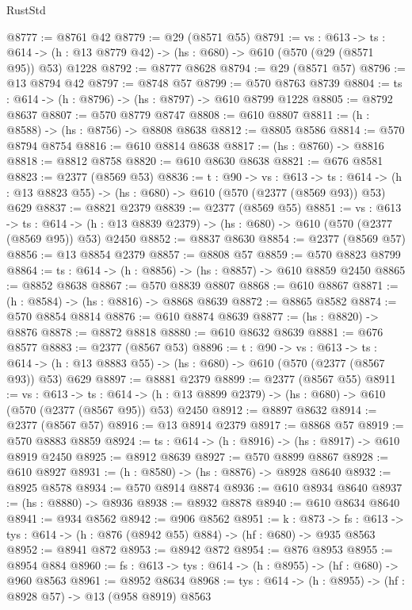 \begin{lexlean}{RustStd}
\begin{coremodule}
@8777 := @8761 @42
@8779 := @29 (@8571 @55)
@8791 := {vs : @613} ->
  {ts : @614} -> (h : @13 @8779 @42) -> (hs : @680) -> @610 (@570 (@29 (@8571 @95)) @53) @1228
@8792 := @8777 @8628
@8794 := @29 (@8571 @57)
@8796 := @13 @8794 @42
@8797 := @8748 @57
@8799 := @570 @8763 @8739
@8804 := {ts : @614} -> (h : @8796) -> (hs : @8797) -> @610 @8799 @1228
@8805 := @8792 @8637
@8807 := @570 @8779 @8747
@8808 := @610 @8807
@8811 := (h : @8588) -> (hs : @8756) -> @8808 @8638
@8812 := @8805 @8586
@8814 := @570 @8794 @8754
@8816 := @610 @8814 @8638
@8817 := (hs : @8760) -> @8816
@8818 := @8812 @8758
@8820 := @610 @8630 @8638
@8821 := @676 @8581
@8823 := @2377 (@8569 @53)
@8836 := {t : @90} ->
  {vs : @613} ->
  {ts : @614} -> (h : @13 @8823 @55) -> (hs : @680) -> @610 (@570 (@2377 (@8569 @93)) @53) @629
@8837 := @8821 @2379
@8839 := @2377 (@8569 @55)
@8851 := {vs : @613} ->
  {ts : @614} -> (h : @13 @8839 @2379) -> (hs : @680) -> @610 (@570 (@2377 (@8569 @95)) @53) @2450
@8852 := @8837 @8630
@8854 := @2377 (@8569 @57)
@8856 := @13 @8854 @2379
@8857 := @8808 @57
@8859 := @570 @8823 @8799
@8864 := {ts : @614} -> (h : @8856) -> (hs : @8857) -> @610 @8859 @2450
@8865 := @8852 @8638
@8867 := @570 @8839 @8807
@8868 := @610 @8867
@8871 := (h : @8584) -> (hs : @8816) -> @8868 @8639
@8872 := @8865 @8582
@8874 := @570 @8854 @8814
@8876 := @610 @8874 @8639
@8877 := (hs : @8820) -> @8876
@8878 := @8872 @8818
@8880 := @610 @8632 @8639
@8881 := @676 @8577
@8883 := @2377 (@8567 @53)
@8896 := {t : @90} ->
  {vs : @613} ->
  {ts : @614} -> (h : @13 @8883 @55) -> (hs : @680) -> @610 (@570 (@2377 (@8567 @93)) @53) @629
@8897 := @8881 @2379
@8899 := @2377 (@8567 @55)
@8911 := {vs : @613} ->
  {ts : @614} -> (h : @13 @8899 @2379) -> (hs : @680) -> @610 (@570 (@2377 (@8567 @95)) @53) @2450
@8912 := @8897 @8632
@8914 := @2377 (@8567 @57)
@8916 := @13 @8914 @2379
@8917 := @8868 @57
@8919 := @570 @8883 @8859
@8924 := {ts : @614} -> (h : @8916) -> (hs : @8917) -> @610 @8919 @2450
@8925 := @8912 @8639
@8927 := @570 @8899 @8867
@8928 := @610 @8927
@8931 := (h : @8580) -> (hs : @8876) -> @8928 @8640
@8932 := @8925 @8578
@8934 := @570 @8914 @8874
@8936 := @610 @8934 @8640
@8937 := (hs : @8880) -> @8936
@8938 := @8932 @8878
@8940 := @610 @8634 @8640
@8941 := @934 @8562
@8942 := @906 @8562
@8951 := {k : @873} ->
  {fs : @613} -> {tys : @614} -> (h : @876 (@8942 @55) @884) -> (hf : @680) -> @935 @8563
@8952 := @8941 @872
@8953 := @8942 @872
@8954 := @876 @8953
@8955 := @8954 @884
@8960 := {fs : @613} -> {tys : @614} -> (h : @8955) -> (hf : @680) -> @960 @8563
@8961 := @8952 @8634
@8968 := {tys : @614} -> (h : @8955) -> (hf : @8928 @57) -> @13 (@958 @8919) @8563

\end{coremodule}
\end{lexlean}
